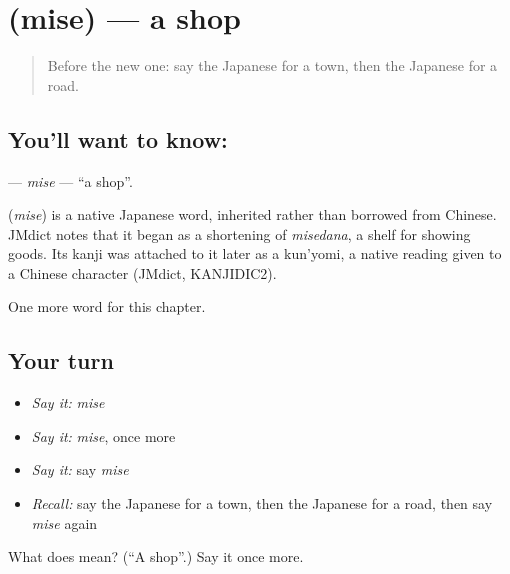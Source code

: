 \section[\texorpdfstring{\ja{みせ} (mise)}{みせ (mise)}]{ (mise) — a shop}

\label{lesson:JA-C57-mise}



\begin{quote}
Before the new one: say the Japanese for a town, then the Japanese for a road.
\end{quote}

\subsection*{You'll want to know: }
\textbf{} — \emph{mise} — \textquotedblleft{}a shop\textquotedblright{}.

\begin{cousinweb}
\textbf{} (\emph{mise}) is a native Japanese word, inherited rather than borrowed from Chinese. JMdict notes that it began as a shortening of \emph{misedana}, a shelf for showing goods. Its kanji was attached to it later as a kun'yomi, a native reading given to a Chinese character (JMdict, KANJIDIC2).
\end{cousinweb}

\begin{grammarlens}[title={What you've built}]
One more word for this chapter.
\end{grammarlens}

\subsection*{Your turn}
\begin{itemize}
\raggedright
  \item \emph{Say it:} \emph{mise}
  \item \emph{Say it:} \emph{mise}, once more
  \item \emph{Say it:} say \emph{mise}
  \item \emph{Recall:} say the Japanese for a town, then the Japanese for a road, then say \emph{mise} again
\end{itemize}

\begin{tcolorbox}[breakable,colback=teal!4,colframe=teal!35!black,title={Before you move on}]
What does  mean? (\textquotedblleft{}A shop\textquotedblright{}.) Say it once more.
\end{tcolorbox}
